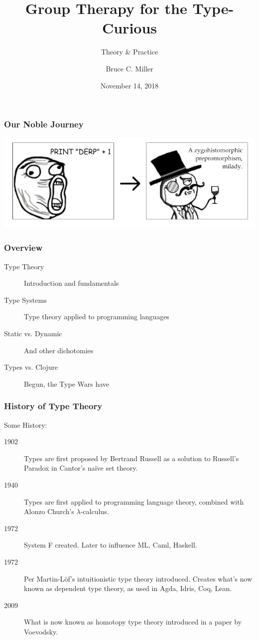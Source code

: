 \documentclass{beamer}
\title{Group Therapy for the Type-Curious}
\subtitle{Theory \& Practice}
\author{Bruce C. Miller}
\institute{bm3719@gmail.com}
\date{November 14, 2018}
\begin{document}
\begin{frame}
  \titlepage
\end{frame}

\begin{frame}
  \frametitle{Our Noble Journey}
  \centerline{\includegraphics[scale=0.4]{img/transformation.png}}
\end{frame}

\begin{frame}
  \frametitle{Overview}
  \begin{description}
  \item[Type Theory] Introduction and fundamentals
  \item[Type Systems] Type theory applied to programming languages
  \item[Static vs. Dynamic] And other dichotomies
  \item[Types vs. Clojure] Begun, the Type Wars have
  \end{description}
\end{frame}

\begin{frame}
  \frametitle{History of Type Theory}
  Some History:
  \begin{description}
  \item[1902] Types are first proposed by Bertrand Russell as a solution to
    Russell's Paradox in Cantor's na{\"i}ve set theory.
  \item[1940] Types are first applied to programming language theory, combined
    with Alonzo Church's $\lambda$-calculus.
  \item[1972] System F created.  Later to influence ML, Caml, Haskell.
  \item[1972] Per Martin-L{\"o}f's intuitionistic type theory introduced.
    Creates what's now known as dependent type theory, as used in Agda, Idris,
    Coq, Lean.
  \item[2009] What is now known as homotopy type theory introduced in a paper
    by Voevodsky.
  \end{description}
\end{frame}
\end{document}

